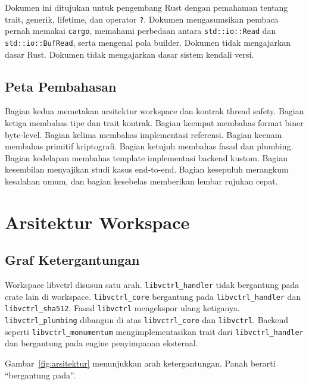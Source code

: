 \documentclass[11pt,a4paper]{article}
\begin{document}
Dokumen ini ditujukan untuk pengembang Rust dengan pemahaman tentang trait, generik, lifetime, dan operator \texttt{?}. Dokumen mengasumsikan pembaca pernah memakai \texttt{cargo}, memahami perbedaan antara \texttt{std::io::Read} dan \texttt{std::io::BufRead}, serta mengenal pola builder. Dokumen tidak mengajarkan dasar Rust. Dokumen tidak mengajarkan dasar sistem kendali versi.

\subsection{Peta Pembahasan}

Bagian kedua memetakan arsitektur workspace dan kontrak thread safety. Bagian ketiga membahas tipe dan trait kontrak. Bagian keempat membahas format biner byte-level. Bagian kelima membahas implementasi referensi. Bagian keenam membahas primitif kriptografi. Bagian ketujuh membahas fasad dan plumbing. Bagian kedelapan membahas template implementasi backend kustom. Bagian kesembilan menyajikan studi kasus end-to-end. Bagian kesepuluh merangkum kesalahan umum, dan bagian kesebelas memberikan lembar rujukan cepat.

\section{Arsitektur Workspace}

\subsection{Graf Ketergantungan}

Workspace libvctrl disusun satu arah. \texttt{libvctrl\_handler} tidak bergantung pada crate lain di workspace. \texttt{libvctrl\_core} bergantung pada \texttt{libvctrl\_handler} dan \texttt{libvctrl\_sha512}. Fasad \texttt{libvctrl} mengekspor ulang ketiganya. \texttt{libvctrl\_plumbing} dibangun di atas \texttt{libvctrl\_core} dan \texttt{libvctrl}. Backend seperti \texttt{libvctrl\_monumentum} mengimplementasikan trait dari \texttt{libvctrl\_handler} dan bergantung pada engine penyimpanan eksternal.

Gambar~\ref{fig:arsitektur} menunjukkan arah ketergantungan. Panah berarti ``bergantung pada''.
\end{document}

